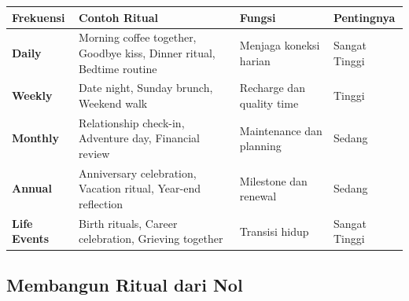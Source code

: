 \begin{center}
\renewcommand{\arraystretch}{1.5}
\begin{tabular}{|>{\raggedright}p{2.5cm}|>{\raggedright}p{4.5cm}|>{\raggedright}p{4.5cm}|>{\raggedright\arraybackslash}p{3.5cm}|}
\hline
\rowcolor{primary!20}
\textbf{Frekuensi} & \textbf{Contoh Ritual} & \textbf{Fungsi} & \textbf{Pentingnya} \\
\hline
\textbf{Daily} & Morning coffee together, Goodbye kiss, Dinner ritual, Bedtime routine & Menjaga koneksi harian & \textcolor{sagegreen}{Sangat Tinggi} \\
\hline
\textbf{Weekly} & Date night, Sunday brunch, Weekend walk & Recharge dan quality time & \textcolor{sagegreen}{Tinggi} \\
\hline
\textbf{Monthly} & Relationship check-in, Adventure day, Financial review & Maintenance dan planning & \textcolor{secondary}{Sedang} \\
\hline
\textbf{Annual} & Anniversary celebration, Vacation ritual, Year-end reflection & Milestone dan renewal & \textcolor{secondary}{Sedang} \\
\hline
\textbf{Life Events} & Birth rituals, Career celebration, Grieving together & Transisi hidup & \textcolor{sagegreen}{Sangat Tinggi} \\
\hline
\end{tabular}
\end{center}

\subsection{Membangun Ritual dari Nol}

